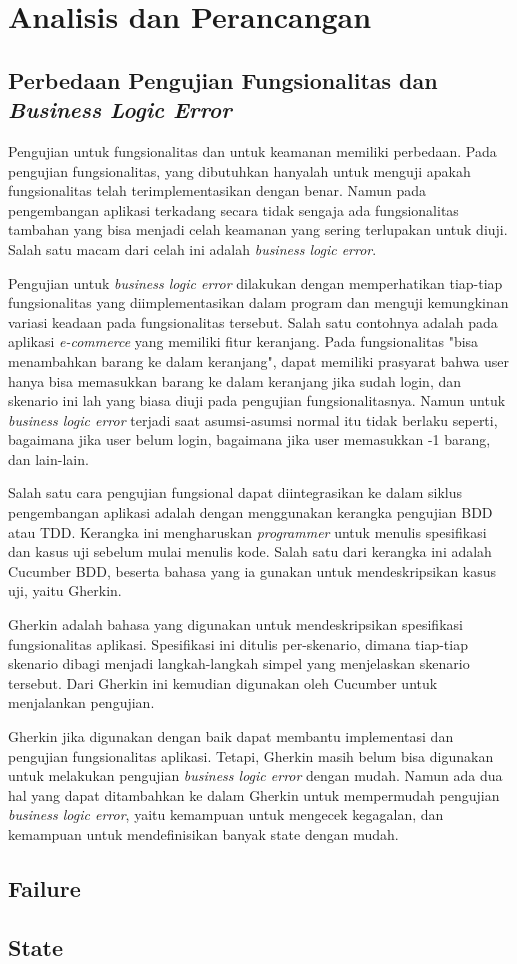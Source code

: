 \chapter{Analisis dan Perancangan}

\section{Perbedaan Pengujian Fungsionalitas dan \emph{Business Logic Error}}

Pengujian untuk fungsionalitas dan untuk keamanan memiliki perbedaan. 
Pada pengujian fungsionalitas, yang dibutuhkan hanyalah untuk menguji apakah
fungsionalitas telah terimplementasikan dengan benar.
Namun pada pengembangan aplikasi terkadang secara tidak sengaja ada fungsionalitas
tambahan yang bisa menjadi celah keamanan yang sering terlupakan untuk diuji.
Salah satu macam dari celah ini adalah \emph{business logic error}.

Pengujian untuk \emph{business logic error} dilakukan dengan memperhatikan tiap-tiap fungsionalitas
yang diimplementasikan dalam program dan menguji kemungkinan variasi keadaan pada
fungsionalitas tersebut. Salah satu contohnya adalah pada aplikasi \emph{e-commerce} yang memiliki
fitur keranjang. Pada fungsionalitas "bisa menambahkan barang ke dalam keranjang", dapat memiliki
prasyarat bahwa user hanya bisa memasukkan barang ke dalam keranjang jika sudah login, dan skenario
ini lah yang biasa diuji pada pengujian fungsionalitasnya. Namun untuk \emph{business logic error} 
terjadi saat asumsi-asumsi normal itu tidak berlaku seperti, bagaimana jika user belum login,
bagaimana jika user memasukkan -1 barang, dan lain-lain.

Salah satu cara pengujian fungsional dapat diintegrasikan ke dalam siklus pengembangan aplikasi
adalah dengan menggunakan kerangka pengujian BDD atau TDD. Kerangka ini mengharuskan \emph{programmer}
untuk menulis spesifikasi dan kasus uji sebelum mulai menulis kode.
Salah satu dari kerangka ini adalah Cucumber BDD, beserta bahasa yang ia gunakan untuk mendeskripsikan
kasus uji, yaitu Gherkin.

Gherkin adalah bahasa yang digunakan untuk mendeskripsikan spesifikasi fungsionalitas
aplikasi. Spesifikasi ini ditulis per-skenario, dimana tiap-tiap skenario dibagi menjadi
langkah-langkah simpel yang menjelaskan skenario tersebut. Dari Gherkin ini kemudian
digunakan oleh Cucumber untuk menjalankan pengujian.

Gherkin jika digunakan dengan baik dapat membantu implementasi dan
pengujian fungsionalitas aplikasi. Tetapi, Gherkin masih belum bisa digunakan untuk melakukan
pengujian \emph{business logic error} dengan mudah. Namun ada dua hal yang dapat ditambahkan
ke dalam Gherkin untuk mempermudah pengujian \emph{business logic error}, yaitu kemampuan untuk
mengecek kegagalan, dan kemampuan untuk mendefinisikan banyak state dengan mudah.

\section{Failure}

\section{State}